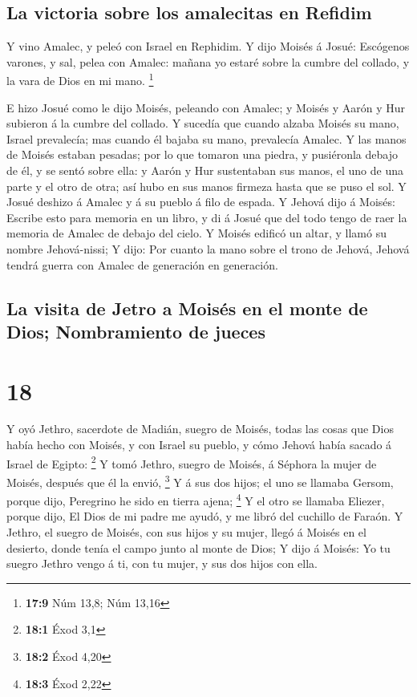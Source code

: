 \hypertarget{la-victoria-sobre-los-amalecitas-en-refidim}{%
\subsection{La victoria sobre los amalecitas en
Refidim}\label{la-victoria-sobre-los-amalecitas-en-refidim}}

 Y vino Amalec, y peleó con Israel en Rephidim. 
Y dijo Moisés á Josué: Escógenos varones, y sal, pelea con Amalec:
mañana yo estaré sobre la cumbre del collado, y la vara de Dios en mi
mano. \footnote{\textbf{17:9} Núm 13,8; Núm 13,16}

 E hizo Josué como le dijo Moisés, peleando con Amalec; y
Moisés y Aarón y Hur subieron á la cumbre del collado.  Y
sucedía que cuando alzaba Moisés su mano, Israel prevalecía; mas cuando
él bajaba su mano, prevalecía Amalec.  Y las manos de
Moisés estaban pesadas; por lo que tomaron una piedra, y pusiéronla
debajo de él, y se sentó sobre ella: y Aarón y Hur sustentaban sus
manos, el uno de una parte y el otro de otra; así hubo en sus manos
firmeza hasta que se puso el sol.  Y Josué deshizo á Amalec
y á su pueblo á filo de espada.  Y Jehová dijo á Moisés:
Escribe esto para memoria en un libro, y di á Josué que del todo tengo
de raer la memoria de Amalec de debajo del cielo.  Y Moisés
edificó un altar, y llamó su nombre Jehová-nissi;  Y dijo:
Por cuanto la mano sobre el trono de Jehová, Jehová tendrá guerra con
Amalec de generación en generación.

\hypertarget{la-visita-de-jetro-a-moisuxe9s-en-el-monte-de-dios-nombramiento-de-jueces}{%
\subsection{La visita de Jetro a Moisés en el monte de Dios;
Nombramiento de
jueces}\label{la-visita-de-jetro-a-moisuxe9s-en-el-monte-de-dios-nombramiento-de-jueces}}

\hypertarget{section-17}{%
\section{18}\label{section-17}}

 Y oyó Jethro, sacerdote de Madián, suegro de Moisés, todas
las cosas que Dios había hecho con Moisés, y con Israel su pueblo, y
cómo Jehová había sacado á Israel de Egipto: \footnote{\textbf{18:1}
  Éxod 3,1}  Y tomó Jethro, suegro de Moisés, á Séphora la
mujer de Moisés, después que él la envió, \footnote{\textbf{18:2} Éxod
  4,20}  Y á sus dos hijos; el uno se llamaba Gersom, porque
dijo, Peregrino he sido en tierra ajena; \footnote{\textbf{18:3} Éxod
  2,22}  Y el otro se llamaba Eliezer, porque dijo, El Dios
de mi padre me ayudó, y me libró del cuchillo de Faraón.  Y
Jethro, el suegro de Moisés, con sus hijos y su mujer, llegó á Moisés en
el desierto, donde tenía el campo junto al monte de Dios;  Y
dijo á Moisés: Yo tu suegro Jethro vengo á ti, con tu mujer, y sus dos
hijos con ella.

